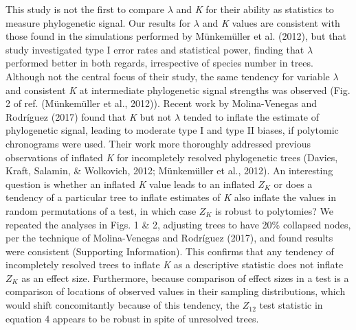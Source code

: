 \documentclass[
]{article}
\begin{document}
This study is not the first to compare \(\lambda\) and \emph{K} for
their ability as statistics to measure phylogenetic signal. Our results
for \(\lambda\) and \emph{K} values are consistent with those found in
the simulations performed by Münkemüller et al. (2012), but that study
investigated type I error rates and statistical power, finding that
\(\lambda\) performed better in both regards, irrespective of species
number in trees. Although not the central focus of their study, the same
tendency for variable \(\lambda\) and consistent \emph{K} at
intermediate phylogenetic signal strengths was observed (Fig. 2 of ref.
(Münkemüller et al., 2012)). Recent work by Molina-Venegas and Rodríguez
(2017) found that \emph{K} but not \(\lambda\) tended to inflate the
estimate of phylogenetic signal, leading to moderate type I and type II
biases, if polytomic chronograms were used. Their work more thoroughly
addressed previous observations of inflated \emph{K} for incompletely
resolved phylogenetic trees (Davies, Kraft, Salamin, \& Wolkovich, 2012;
Münkemüller et al., 2012). An interesting question is whether an
inflated \emph{K} value leads to an inflated \(Z_K\) or does a tendency
of a particular tree to inflate estimates of \emph{K} also inflate the
values in random permutations of a test, in which case \(Z_K\) is robust
to polytomies? We repeated the analyses in Figs. 1 \& 2, adjusting trees
to have 20\% collapsed nodes, per the technique of Molina-Venegas and
Rodríguez (2017), and found results were consistent (Supporting
Information). This confirms that any tendency of incompletely resolved
trees to inflate \emph{K} as a descriptive statistic does not inflate
\(Z_K\) as an effect size. Furthermore, because comparison of effect
sizes in a test is a comparison of locations of observed values in their
sampling distributions, which would shift concomitantly because of this
tendency, the \(Z_{12}\) test statistic in equation 4 appears to be
robust in spite of unresolved trees. \hfill\break
\end{document}

